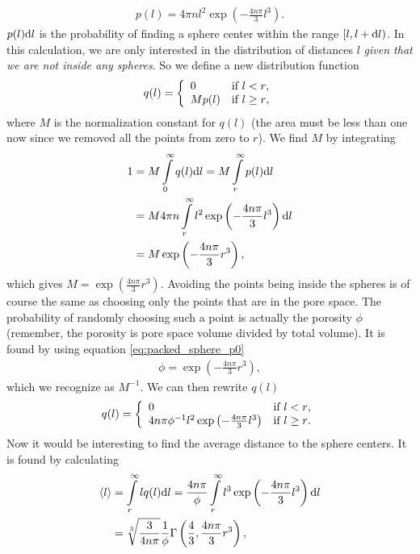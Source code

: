 \begin{align}
	\label{eq:packed_sphere_probability_number_density}
	p(l) = 4\pi n l^2 \exp\left(-\frac{4n\pi}{3}l^3\right).
\end{align}
$p(l)\mathrm{d}l$ is the probability of finding a sphere center within the range $[l, l+\mathrm{d}l)$. In this calculation, we are only interested in the distribution of distances $l$ \textit{given that we are not inside any spheres}. So we define a new distribution function
\begin{align}
	q(l) = \left\{\begin{array}{l l}
			0 & \text{if $l<r$},\\
			Mp(l) & \text{if $l\geq r$},
			\end{array}\right.
\end{align}
where $M$ is the normalization constant for $q(l)$ (the area must be less than one now since we removed all the points from zero to $r$). We find $M$ by integrating
\begin{align}
	1 &= M\int\limits_0^\infty q(l)\mathrm{d}l = M\int\limits_r^\infty p(l)\mathrm{d}l\\
	&= M4\pi n\int\limits_r^\infty l^2 \exp\left(-\frac{4n\pi}{3}l^3\right) \mathrm{d}l\\
	&= M\exp\left(-\frac{4n\pi}{3}r^3\right),
\end{align}
which gives $M=\exp\left(\frac{4n\pi}{3}r^3\right)$. Avoiding the points being inside the spheres is of course the same as choosing only the points that are in the pore space. The probability of randomly choosing such a point is actually the porosity $\phi$ (remember, the porosity is pore space volume divided by total volume). It is found by using equation \eqref{eq:packed_sphere_p0}
\begin{align}
	\label{eq:packed_sphere_porosity}
	\phi = \exp\left(-\frac{4n\pi}{3}r^3\right),
\end{align}
which we recognize as $M^{-1}$. We can then rewrite $q(l)$
\begin{align}
	q(l) = \left\{\begin{array}{l l}
			0 & \text{if $l<r$},\\
			4n\pi\phi^{-1} l^2 \exp\left(-\frac{4n\pi}{3}l^3\right) & \text{if $l\geq r$}.
			\end{array}\right.
\end{align}
Now it would be interesting to find the average distance to the sphere centers. It is found by calculating
\begin{align}
	\langle l\rangle &= \int\limits_r^\infty lq(l) \mathrm{d}l = \frac{4n\pi}{\phi}\int\limits_r^\infty l^3 \exp\left(-\frac{4n\pi}{3}l^3\right) \mathrm{d}l \\
	\label{eq:packed_sphere_average_distance}
	&= \sqrt[3]{\frac{3}{4n\pi}}\frac{1}{\phi}\Gamma\left(\frac{4}{3}, \frac{4n\pi}{3}r^3\right),
\end{align}
